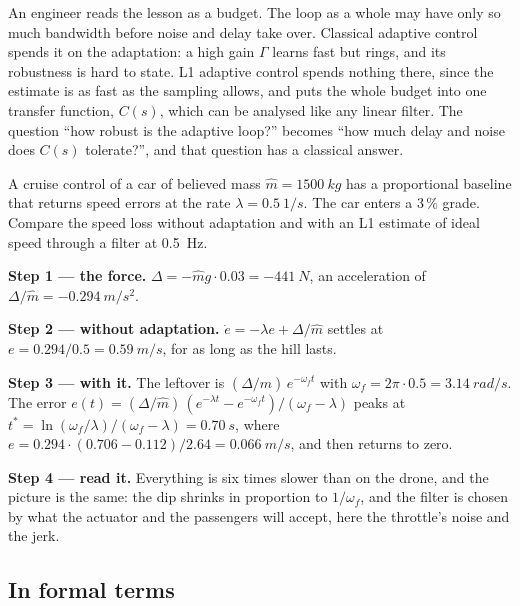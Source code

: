 An engineer reads the lesson as a budget. The loop as a whole may have only so much bandwidth before noise and delay take over. Classical adaptive control spends it on the adaptation: a high gain $\Gamma$ learns fast but rings, and its robustness is hard to state. L1 adaptive control spends nothing there, since the estimate is as fast as the sampling allows, and puts the whole budget into one transfer function, $C(s)$, which can be analysed like any linear filter. The question \enquote{how robust is the adaptive loop?} becomes \enquote{how much delay and noise does $C(s)$ tolerate?}, and that question has a classical answer.

\begin{example}
\label{ex:l1-car}
A cruise control of a car of believed mass $\hat m = \SI{1500}{kg}$ has a proportional baseline that returns speed errors at the rate $\lambda = \SI{0.5}{1/s}$. The car enters a 3\,\% grade. Compare the speed loss without adaptation and with an L1 estimate of ideal speed through a filter at \SI{0.5}{Hz}.

\textbf{Step 1 — the force.} $\Delta = -\hat m g \cdot 0.03 = \SI{-441}{N}$, an acceleration of $\Delta/\hat m = \SI{-0.294}{m/s^2}$.

\textbf{Step 2 — without adaptation.} $\dot e = -\lambda e + \Delta/\hat m$ settles at $e = 0.294/0.5 = \SI{0.59}{m/s}$, for as long as the hill lasts.

\textbf{Step 3 — with it.} The leftover is $(\Delta/\hat m)\,e^{-\omega_ft}$ with $\omega_f = 2\pi \cdot 0.5 = \SI{3.14}{rad/s}$. The error $e(t) = (\Delta/\hat m)\,(e^{-\lambda t} - e^{-\omega_ft})/(\omega_f - \lambda)$ peaks at $t^* = \ln(\omega_f/\lambda)/(\omega_f - \lambda) = \SI{0.70}{s}$, where $e = 0.294 \cdot (0.706 - 0.112)/2.64 = \SI{0.066}{m/s}$, and then returns to zero.

\textbf{Step 4 — read it.} Everything is six times slower than on the drone, and the picture is the same: the dip shrinks in proportion to $1/\omega_f$, and the filter is chosen by what the actuator and the passengers will accept, here the throttle's noise and the jerk.
\end{example}

\subsection{In formal terms}


